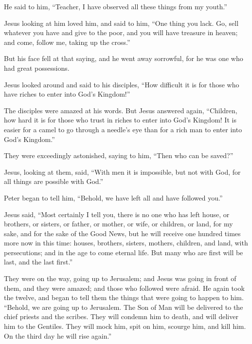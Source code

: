  He said to him, ``Teacher, I have observed all these
things from my youth.''

 Jesus looking at him loved him, and said to him, ``One
thing you lack. Go, sell whatever you have and give to the poor, and you
will have treasure in heaven; and come, follow me, taking up the
cross.''

 But his face fell at that saying, and he went away
sorrowful, for he was one who had great possessions.

 Jesus looked around and said to his disciples, ``How
difficult it is for those who have riches to enter into God's Kingdom!''

 The disciples were amazed at his words. But Jesus answered
again, ``Children, how hard it is for those who trust in riches to enter
into God's Kingdom!  It is easier for a camel to go through
a needle's eye than for a rich man to enter into God's Kingdom.''

 They were exceedingly astonished, saying to him, ``Then
who can be saved?''

 Jesus, looking at them, said, ``With men it is impossible,
but not with God, for all things are possible with God.''

 Peter began to tell him, ``Behold, we have left all and
have followed you.''

 Jesus said, ``Most certainly I tell you, there is no one
who has left house, or brothers, or sisters, or father, or mother, or
wife, or children, or land, for my sake, and for the sake of the Good
News,  but he will receive one hundred times more now in
this time: houses, brothers, sisters, mothers, children, and land, with
persecutions; and in the age to come eternal life.  But
many who are first will be last, and the last first.''

 They were on the way, going up to Jerusalem; and Jesus was
going in front of them, and they were amazed; and those who followed
were afraid. He again took the twelve, and began to tell them the things
that were going to happen to him.  ``Behold, we are going
up to Jerusalem. The Son of Man will be delivered to the chief priests
and the scribes. They will condemn him to death, and will deliver him to
the Gentiles.  They will mock him, spit on him, scourge
him, and kill him. On the third day he will rise again.''

